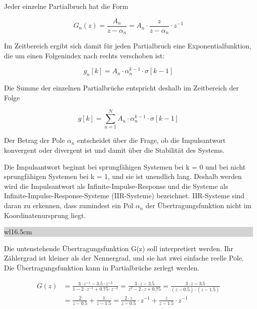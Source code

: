 \noindent Jeder einzelne Partialbruch hat die Form 

\begin{equation}\label{eq:sixsninety}
G_{n} \left(z\right)=\frac{A_{n} }{z-\alpha _{n} } =A_{n} \cdot \frac{z}{z-\alpha _{n} } \cdot z^{-1}
\end{equation}

\noindent Im Zeitbereich ergibt sich damit f\"{u}r jeden Partialbruch eine Exponentialfunktion, die um einen Folgenindex nach rechts verschoben ist:

\begin{equation}\label{eq:sixsninetyone}
g_{n} \left[k\right]=A_{n} \cdot \alpha _{n}^{k-1} \cdot \sigma \left[k-1\right]
\end{equation}

\noindent Die Summe der einzelnen Partialbr\"{u}che entspricht deshalb im Zeitbereich der Folge

\begin{equation}\label{eq:sixsninetytwo}
g\left[k\right]=\sum _{n=1}^{N}A_{n} \cdot \alpha _{n}^{k-1} \cdot \sigma \left[k-1\right]
\end{equation}

\noindent Der Betrag der Pole $\alpha_{n}$ entscheidet \"{u}ber die Frage, ob die Impulsantwort konvergent oder divergent ist und damit \"{u}ber die Stabilit\"{a}t des Systems. 

\noindent Die Impulsantwort beginnt bei sprungf\"{a}higen Systemen bei k = 0 und bei nicht sprungf\"{a}higen Systemen bei k = 1, und sie ist unendlich lang. Deshalb werden wird die Impulsantwort als Infinite-Impulse-Response und die Systeme als Infinite-Impulse-Response-Systeme (IIR-Systeme) bezeichnet. IIR-Systeme sind daran zu erkennen, dass zumindest ein Pol $\alpha_{n}$ der \"{U}bertragungsfunktion nicht im Koordinatenursprung liegt.\bigskip

\noindent
\colorbox{lightgray}{%
%
\renewcommand\arraystretch{0.6}%
\begin{tabular}{ wl{16.5cm} }
{}
\end{tabular}%
}\medskip

\noindent Die untenstehende \"{U}bertragungsfunktion G(z) soll interpretiert werden. Ihr Z\"{a}hlergrad ist kleiner als der Nennergrad, und sie hat zwei einfache reelle Pole. Die \"{U}bertragungsfunktion kann in Partialbr\"{u}che zerlegt werden.

\begin{equation}\label{eq:sixsninetythree}
\begin{split}
G\left(z\right)&=\frac{3\cdot z^{-1} -3.5\cdot z^{-2} }{1-2\cdot z^{-1} +0.75\cdot z^{-2} } =\frac{3\cdot z-3.5}{z^{2} -2\cdot z+0.75} =\frac{3\cdot z-3.5}{\left(z-0.5\right)\cdot \left(z-1.5\right)} \\ & =\frac{2}{z-0.5} +\frac{1}{z-1.5} =\frac{2\cdot z}{z-0.5} \cdot z^{-1} +\frac{z}{z-1.5} \cdot z^{-1}
\end{split}
\end{equation}

